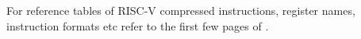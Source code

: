 \documentclass[9pt, a4paper]{extarticle}
\begin{document}
For reference tables of RISC-V compressed instructions, register names, instruction formats etc refer to the first few pages of \cite{harris2022}.

\end{document}
